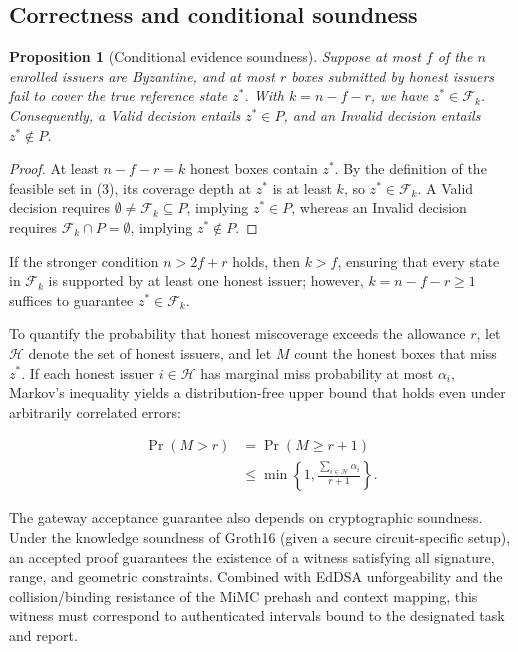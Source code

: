 \documentclass[pdflatex,iicol,sn-mathphys-num]{sn-jnl}
\theoremstyle{thmstyleone}
\newtheorem{proposition}{Proposition}
\begin{document}
\subsection{Correctness and conditional soundness}
\begin{proposition}[Conditional evidence soundness]\label{prop:soundness}
Suppose at most $f$ of the $n$ enrolled issuers are Byzantine, and at most $r$ boxes submitted by honest issuers fail to cover the true reference state $z^*$. With $k = n - f - r$, we have $z^* \in \mathcal{F}_k$. Consequently, a Valid decision entails $z^* \in P$, and an Invalid decision entails $z^* \notin P$.
\end{proposition}
\begin{proof}
At least $n - f - r = k$ honest boxes contain $z^*$. By the definition of the feasible set in (3), its coverage depth at $z^*$ is at least $k$, so $z^* \in \mathcal{F}_k$. A Valid decision requires $\emptyset \neq \mathcal{F}_k \subseteq P$, implying $z^* \in P$, whereas an Invalid decision requires $\mathcal{F}_k \cap P = \emptyset$, implying $z^* \notin P$.
\end{proof}

If the stronger condition $n > 2f + r$ holds, then $k > f$, ensuring that every state in $\mathcal{F}_k$ is supported by at least one honest issuer; however, $k = n - f - r \ge 1$ suffices to guarantee $z^* \in \mathcal{F}_k$.

To quantify the probability that honest miscoverage exceeds the allowance $r$, let $\mathcal{H}$ denote the set of honest issuers, and let $M$ count the honest boxes that miss $z^*$. If each honest issuer $i \in \mathcal{H}$ has marginal miss probability at most $\alpha_i$, Markov's inequality yields a distribution-free upper bound that holds even under arbitrarily correlated errors:


\begin{equation}\label{eq:calibration}
\begin{split}
\Pr(M > r) &= \Pr(M \ge r + 1) \\
&\le \min\left\{1, \frac{\sum_{i \in \mathcal{H}} \alpha_i}{r + 1}\right\}.
\end{split}
\end{equation}

The gateway acceptance guarantee also depends on cryptographic soundness. Under the knowledge soundness of Groth16 (given a secure circuit-specific setup), an accepted proof guarantees the existence of a witness satisfying all signature, range, and geometric constraints. Combined with EdDSA unforgeability and the collision/binding resistance of the MiMC prehash and context mapping, this witness must correspond to authenticated intervals bound to the designated task and report.
\end{document}
